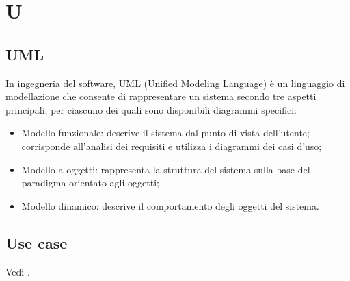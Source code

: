 \section{U}

\vspace{2em}
\subsection*{UML}
\par In ingegneria del software, UML (Unified Modeling Language) è un linguaggio di modellazione che consente di rappresentare un sistema secondo tre aspetti principali, per ciascuno dei quali sono disponibili diagrammi specifici:
\begin{itemize}
  \item Modello funzionale: descrive il sistema dal punto di vista dell'utente; corrisponde all'analisi dei requisiti e utilizza i diagrammi dei casi d'uso;
  \item Modello a oggetti: rappresenta la struttura del sistema sulla base del paradigma orientato agli oggetti;
  \item Modello dinamico: descrive il comportamento degli oggetti del sistema.
\end{itemize}

\vspace{2em}
\subsection*{Use case}
\par Vedi .
